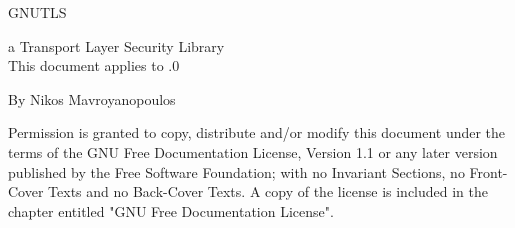 \thispagestyle{empty}

\setlength{\parindent}{0mm}

\setlength{\parskip}{0mm}

 {\Huge GNUTLS\\[.1mm]}
 \HRule
 \begin{flushright}
  a Transport Layer Security Library\\[1mm]
  This document applies to .0
 \end{flushright}


 {\Large By Nikos Mavroyanopoulos\\[.1mm]}
 \HRule
 
\newpage


\begin{center}
\par
Permission is granted to copy, distribute and/or modify this
document under the terms of the GNU Free Documentation License,
Version 1.1 or any later version published by the Free Software
Foundation; with no Invariant Sections, no Front-Cover Texts and
no Back-Cover Texts.  A copy of the license is included in the
chapter entitled "GNU Free Documentation License".
\end{center}

\setlength{\parindent}{2mm}

\setlength{\parskip}{1mm}
